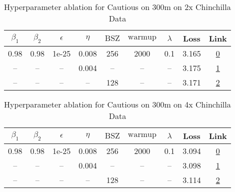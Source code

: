 \begin{table}[H]
\centering
\caption{Hyperparameter ablation for Cautious on 300m on 2x Chinchilla Data}
\label{tab:ablation_cautious_300m_2}
\begin{tabular}{ccccccccc}
\toprule
$\beta_1$ & $\beta_2$ & $\epsilon$ & $\eta$ & $\mathrm{BSZ}$ & $\mathrm{warmup}$ & $\lambda$ & Loss & Link \\
\midrule
0.98 & 0.98 & 1e-25 & 0.008 & 256 & 2000 & 0.1 & 3.165 & \href{https://wandb.ai/stanford-mercury/optimizer-scaling/runs/sweep-300m-12B-cautious008d65lr0.008-wd0.1-minlr0-warmup2000-b10-69dcda}{0} \\
\midrule
-- & -- & -- & 0.004 & -- & -- & -- & 3.175 & \href{https://wandb.ai/stanford-mercury/optimizer-scaling/runs/sweep-300m-12B-cautious188cablr0.004-wd0.1-minlr0-warmup2000-b10-be1c3d}{1} \\
-- & -- & -- & -- & 128 & -- & -- & 3.171 & \href{https://wandb.ai/stanford-mercury/optimizer-scaling/runs/sweep-300m-12B-cautious820e4dlr0.008-wd0.1-minlr0-warmup2000-b10-fe955e}{2} \\
\bottomrule
\end{tabular}
\end{table}

\begin{table}[H]
\centering
\caption{Hyperparameter ablation for Cautious on 300m on 4x Chinchilla Data}
\label{tab:ablation_cautious_300m_4}
\begin{tabular}{ccccccccc}
\toprule
$\beta_1$ & $\beta_2$ & $\epsilon$ & $\eta$ & $\mathrm{BSZ}$ & $\mathrm{warmup}$ & $\lambda$ & Loss & Link \\
\midrule
0.98 & 0.98 & 1e-25 & 0.008 & 256 & 2000 & 0.1 & 3.094 & \href{https://wandb.ai/stanford-mercury/optimizer-scaling/runs/sweep-300m-24B-cautious820e4dlr0.008-wd0.1-minlr0-warmup2000-b10-fe0a65}{0} \\
\midrule
-- & -- & -- & 0.004 & -- & -- & -- & 3.098 & \href{https://wandb.ai/stanford-mercury/optimizer-scaling/runs/sweep-300m-24B-cautious2e72c8lr0.004-wd0.1-minlr0-warmup2000-b10-13950f}{1} \\
-- & -- & -- & -- & 128 & -- & -- & 3.114 & \href{https://wandb.ai/stanford-mercury/optimizer-scaling/runs/sweep-300m-24B-cautious1c558clr0.008-wd0.1-minlr0-warmup2000-b10-69130a}{2} \\
\bottomrule
\end{tabular}
\end{table}

